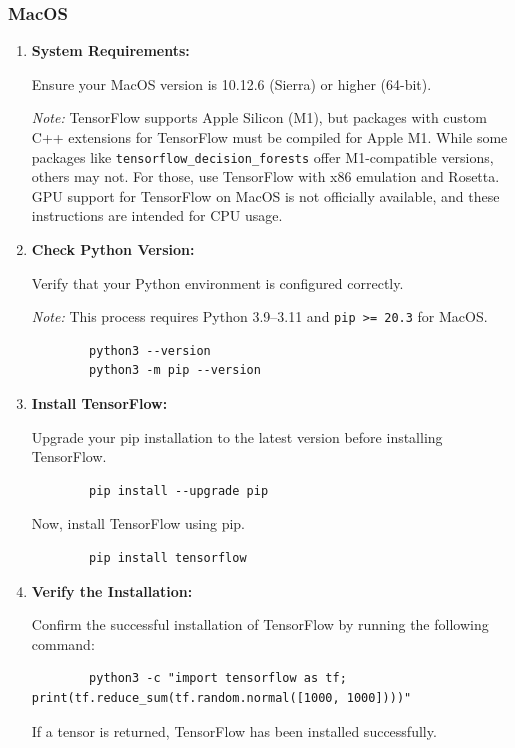 \subsubsection{MacOS}

\begin{enumerate}
	\item \textbf{System Requirements:}
	
	Ensure your MacOS version is 10.12.6 (Sierra) or higher (64-bit).
	
	\emph{Note:} TensorFlow supports Apple Silicon (M1), but packages with custom C++ extensions for TensorFlow must be compiled for Apple M1. While some packages like \texttt{tensorflow\_decision\_forests} offer M1-compatible versions, others may not. For those, use TensorFlow with x86 emulation and Rosetta. GPU support for TensorFlow on MacOS is not officially available, and these instructions are intended for CPU usage.
	
	\item \textbf{Check Python Version:}
	
	Verify that your Python environment is configured correctly.
	
	\emph{Note:} This process requires Python 3.9--3.11 and \texttt{pip >= 20.3} for MacOS.
	
	\begin{verbatim}
		python3 --version
		python3 -m pip --version
	\end{verbatim}
	
	\item \textbf{Install TensorFlow:}
	
	Upgrade your pip installation to the latest version before installing TensorFlow.
	
	\begin{verbatim}
		pip install --upgrade pip
	\end{verbatim}
	
	Now, install TensorFlow using pip.
	
	\begin{verbatim}
		pip install tensorflow
	\end{verbatim}
	
	\item \textbf{Verify the Installation:}
	
	Confirm the successful installation of TensorFlow by running the following command:
	
	\begin{verbatim}
		python3 -c "import tensorflow as tf; print(tf.reduce_sum(tf.random.normal([1000, 1000])))"
	\end{verbatim}
	
	If a tensor is returned, TensorFlow has been installed successfully.
\end{enumerate}



